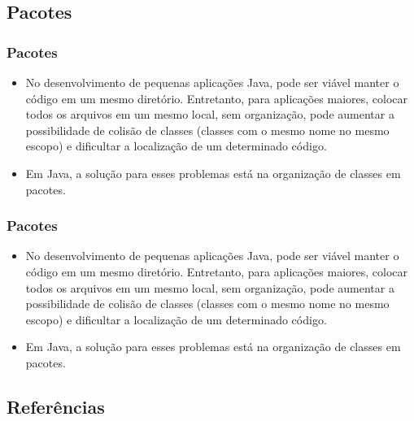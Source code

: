 \documentclass{beamer}
\begin{document}
\subsection{Pacotes}
\begin{frame}
	\frametitle{Pacotes}
	\begin{itemize}
		\item No desenvolvimento de pequenas aplicações Java, pode ser viável manter o código em um mesmo diretório. Entretanto, para aplicações maiores, colocar todos os arquivos em um mesmo local, sem organização, pode aumentar a possibilidade de colisão de classes (classes com o mesmo nome no mesmo escopo) e dificultar a localização de um determinado código.
		\item Em Java, a solução para esses problemas está na organização de classes em pacotes.
	\end{itemize}
\end{frame}
\begin{frame}
	\frametitle{Pacotes}
	\begin{itemize}
		\item No desenvolvimento de pequenas aplicações Java, pode ser viável manter o código em um mesmo diretório. Entretanto, para aplicações maiores, colocar todos os arquivos em um mesmo local, sem organização, pode aumentar a possibilidade de colisão de classes (classes com o mesmo nome no mesmo escopo) e dificultar a localização de um determinado código.
		\item Em Java, a solução para esses problemas está na organização de classes em pacotes.
	\end{itemize}
\end{frame}

\subsection{Referências}
\end{document}
